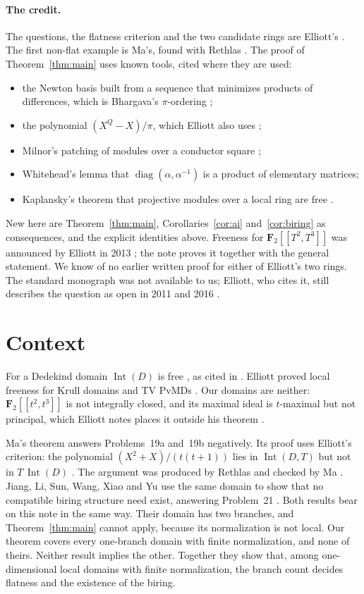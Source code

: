 \documentclass[11pt,a4paper]{article}
\theoremstyle{plain}
\theoremstyle{remark}
\newcommand{\F}{\mathbf F}
\newcommand{\Int}{\operatorname{Int}}
\begin{document}
\paragraph{The credit.}
The questions, the flatness criterion and the two candidate rings are Elliott's \cite{E11a,E11b,CFFG}. The first
non-flat example is Ma's, found with Rethlas \cite{Ma,Rethlas}. The proof of Theorem~\ref{thm:main} uses known tools,
cited where they are used:
\begin{itemize}
\item the Newton basis built from a sequence that minimizes products of differences, which is Bhargava's
$\pi$-ordering \cite{Bha};
\item the polynomial $(X^Q-X)/\pi$, which Elliott also uses \cite[Proposition~5.4, p.~16]{E11b};
\item Milnor's patching of modules over a conductor square \cite[\S2]{Mil};
\item Whitehead's lemma that $\operatorname{diag}(\alpha,\alpha^{-1})$ is a product of elementary matrices;
\item Kaplansky's theorem that projective modules over a local ring are free \cite{Kap}.
\end{itemize}
New here are Theorem~\ref{thm:main}, Corollaries~\ref{cor:ai} and~\ref{cor:biring} as consequences, and the explicit
identities above. Freeness for $\F_2[[T^2,T^3]]$ was announced by Elliott in 2013 \cite{MO}; the note proves it
together with the general statement. We know of no earlier written proof for either of Elliott's two rings. The
standard monograph \cite{CC} was not available to us; Elliott, who cites it, still describes the question as open in
2011 and 2016 \cite{E11b,E16b}.

\section{Context}

For a Dedekind domain $\Int(D)$ is free \cite[Remark~II.3.7(iii)]{CC}, as cited in \cite[p.~2]{E11b}.
Elliott proved local freeness for Krull domains and TV PvMDs \cite[Theorem~1.2]{E11a}. Our domains are neither:
$\F_2[[t^2,t^3]]$ is not integrally closed, and its maximal ideal is $t$-maximal but not principal, which Elliott
notes places it outside his theorem \cite[p.~4]{E11a}.

Ma's theorem \cite[Theorem~1.1]{Ma} answers Problems~19a and~19b negatively. Its proof uses Elliott's criterion: the
polynomial $(X^2+X)/(t(t+1))$ lies in $\Int(D,T)$ but not in $T\,\Int(D)$ \cite[Proposition~4.1, pp.~4--5]{Ma}. The
argument was produced by Rethlas and checked by Ma \cite[\S6]{Ma}. Jiang, Li, Sun, Wang, Xiao and Yu use the same
domain to show that no compatible biring structure need exist, answering Problem~21 \cite[Theorem~3.4]{JLSWXY}. Both
results bear on this note in the same way. Their domain has two branches, and Theorem~\ref{thm:main} cannot apply,
because its normalization is not local. Our theorem covers every one-branch domain with finite normalization, and
none of theirs. Neither result implies the other. Together they show that, among one-dimensional local domains with
finite normalization, the branch count decides flatness and the existence of the biring.
\end{document}
